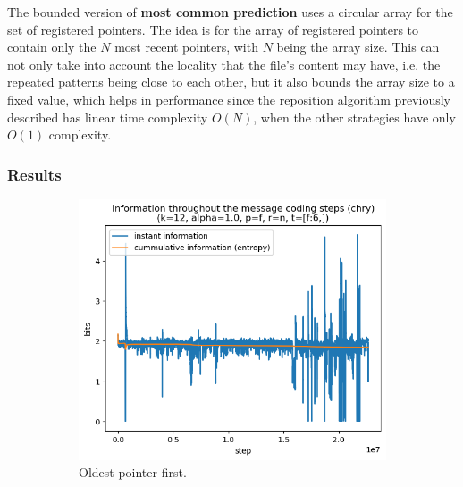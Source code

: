 \documentclass{article}
\begin{document}
The bounded version of \textbf{most common prediction} uses a circular array for the set of registered pointers.
The idea is for the array of registered pointers to contain only the $N$ most recent pointers, with $N$ being the array size.
This can not only take into account the locality that the file's content may have, i.e. the repeated patterns being close to each other, but it also bounds the array size to a fixed value, which helps in performance since the reposition algorithm previously described has linear time complexity $O(N)$, when the other strategies have only $O(1)$ complexity.

\subsubsection{Results}

\begin{figure}
    \begin{subfigure}[b]{0.3\textwidth}
        \begin{center}
            \includegraphics[width=1.0\linewidth]{../scripts/images/chry_12_1.0_f_n_[f:6,].png}
        \end{center}
        \caption{Oldest pointer first.}
        \label{fig:results-reposition-n}
    \end{subfigure}
    \hfill
    \begin{subfigure}[b]{0.3\textwidth}
        \begin{center}

\end{center}
\end{subfigure}
\end{figure}
\end{document}
